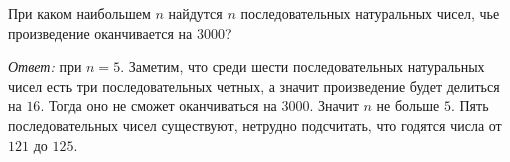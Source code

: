\problem
При каком наибольшем $n$ найдутся $n$ последовательных натуральных чисел, чье
произведение оканчивается на $3000$?

\solution
\emph{Ответ:} при $n = 5$.
Заметим, что среди шести последовательных натуральных чисел есть три
последовательных четных, а значит произведение будет делиться на $16$.
Тогда оно не сможет оканчиваться на $3000$.
Значит $n$ не больше $5$.
Пять последовательных чисел существуют, нетрудно подсчитать, что годятся числа
от $121$ до $125$.
\endproblem
